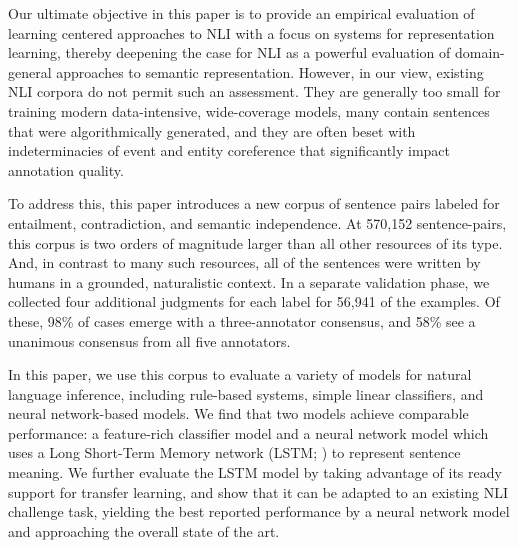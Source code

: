Our ultimate objective in this paper is to provide an empirical
evaluation of learning centered approaches to NLI with a focus on
systems for representation learning,
thereby deepening the case for NLI as a powerful evaluation of 
domain-general approaches to semantic representation. 
However, in our view, existing NLI corpora do not
permit such an assessment. They are generally too small for training
modern data-intensive, wide-coverage models, many contain sentences
that were algorithmically generated, and they are often beset with
indeterminacies of event and entity coreference that significantly
impact annotation quality.

To address this, this paper introduces a new corpus of sentence pairs labeled for
entailment, contradiction, and semantic independence. At 570,152
sentence-pairs, this corpus is two orders of magnitude larger than all
other resources of its type. And, in contrast to many such resources,
all of the sentences were written by humans in a grounded,
naturalistic context. In a separate validation phase, we collected
four additional judgments for each label for 56,941 of the examples.
Of these, 98\% of cases emerge with a three-annotator consensus, 
and 58\% see a unanimous consensus from all five annotators.

In this paper, we use this corpus to evaluate a variety of models
for natural language inference, including rule-based systems, simple
linear classifiers, and neural network-based models. 
We find that two models achieve comparable performance: a feature-rich
classifier model and a neural network model which uses a Long Short-Term Memory network (LSTM; 
\citealt{hochreiter1997long}) to represent sentence meaning. We further evaluate the LSTM model
by taking advantage of its ready support for transfer learning, and show that it can be adapted to an existing
NLI challenge task, yielding the best reported performance by a neural network model and approaching the overall state of the art.





